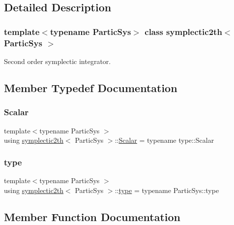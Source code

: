 \subsection{Detailed Description}
\subsubsection*{template$<$typename Partic\+Sys$>$\newline
class symplectic2th$<$ Partic\+Sys $>$}

Second order symplectic integrator. 

\subsection{Member Typedef Documentation}
\mbox{\label{classsymplectic2th_a801a87947fe8e90ee68759952c937ed5}} 
\subsubsection{\texorpdfstring{Scalar}{Scalar}}
{\footnotesize\ttfamily template$<$typename Partic\+Sys $>$ \\
using \mbox{\hyperlink{classsymplectic2th}{symplectic2th}}$<$ Partic\+Sys $>$\+::\mbox{\hyperlink{classsymplectic2th_a801a87947fe8e90ee68759952c937ed5}{Scalar}} =  typename type\+::\+Scalar}

\mbox{\label{classsymplectic2th_a88bc0c031313c7752d9891c927641b9f}} 
\subsubsection{\texorpdfstring{type}{type}}
{\footnotesize\ttfamily template$<$typename Partic\+Sys $>$ \\
using \mbox{\hyperlink{classsymplectic2th}{symplectic2th}}$<$ Partic\+Sys $>$\+::\mbox{\hyperlink{classsymplectic2th_a88bc0c031313c7752d9891c927641b9f}{type}} =  typename Partic\+Sys\+::type}



\subsection{Member Function Documentation}
\mbox{\label{classsymplectic2th_ade78f67685ed50280a210e67397af092}} 
